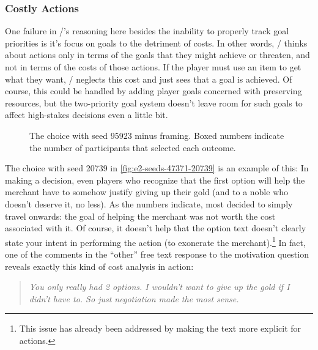\subsubsection{Costly Actions}

One failure in \dunyazad/'s reasoning here besides the inability to properly track goal priorities is it's focus on goals to the detriment of costs.
%
In other words, \dunyazad/ thinks about actions only in terms of the goals that they might achieve or threaten, and not in terms of the costs of those actions.
%
If the player must use an item to get what they want, \dunyazad/ neglects this cost and just sees that a goal is achieved.
%
Of course, this could be handled by adding player goals concerned with preserving resources, but the two-priority goal system doesn't leave room for such goals to affect high-stakes decisions even a little bit.

\begin{figure}[!b]
\caption[``Obvious failure'' choice 95923]{The \obvf{} choice with seed 95923 minus framing. Boxed numbers indicate the number of participants that selected each outcome.}
\label{fig:e2-seed-95923}
\end{figure}


The choice with seed 20739 in \cref{fig:e2-seeds-47371-20739} is an example of this: In making a decision, even players who recognize that the first option will help the merchant have to somehow justify giving up their gold (and to a noble who doesn't deserve it, no less).
%
As the numbers indicate, most decided to simply travel onwards: the goal of helping the merchant was not worth the cost associated with it.
%
Of course, it doesn't help that the option text doesn't clearly state your intent in performing the action (to exonerate the merchant).\footnote{This issue has already been addressed by making the text more explicit for  actions.}
%
In fact, one of the comments in the ``other'' free text response to the motivation question reveals exactly this kind of cost analysis in action:

\begin{quote}
  \slshape
You only really had 2 options. I wouldn't want to give up the gold if I didn't have to. So just negotiation made the most sense.
\end{quote}

